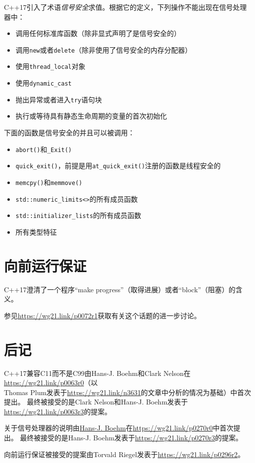 C++17引入了术语\emph{信号安全}求值。根据它的定义，下列操作不能出现在信号处理器中：
\begin{itemize}
    \item 调用任何标准库函数（除非显式声明了是信号安全的）
    \item 调用\texttt{new}或者\texttt{delete}（除非使用了信号安全的内存分配器）
    \item 使用\texttt{thread\_local}对象
    \item 使用\texttt{dynamic\_cast}
    \item 抛出异常或者进入\texttt{try}语句块
    \item 执行或等待具有静态生命周期的变量的首次初始化
\end{itemize}
下面的函数是信号安全的并且可以被调用：
\begin{itemize}
    \item \texttt{abort()}和\texttt{\_Exit()}
    \item \texttt{quick\_exit()}，前提是用\texttt{at\_quick\_exit()}注册的函数是线程安全的
    \item \texttt{memcpy()}和\texttt{memmove()}
    \item \texttt{std::numeric\_limits<>}的所有成员函数
    \item \texttt{std::initializer\_lists}的所有成员函数
    \item 所有类型特征
\end{itemize}

\section{向前运行保证}
C++17澄清了一个程序“make progress”（取得进展）或者“block”（阻塞）的含义。

参见\url{https://wg21.link/p0072r1}获取有关这个话题的进一步讨论。

\section{后记}
C++17兼容C11而不是C99由Hans-J. Boehm和Clark Nelson在\url{https://wg21.link/p0063r0}（以\\
Thomas Plum发表于\url{https://wg21.link/n3631}的文章中分析的情况为基础）中首次提出。
最终被接受的是Clark Nelson和Hans-J. Boehm发表于\url{https://wg21.link/p0063r3}的提案。

关于信号处理器的说明由\url{Hans-J. Boehm}在\url{https://wg21.link/p0270r0}中首次提出。
最终被接受的是Hans-J. Boehm发表于\url{https://wg21.link/p0270r3}的提案。

向前运行保证被接受的提案由Torvald Riegel发表于\url{https://wg21.link/p0296r2}。